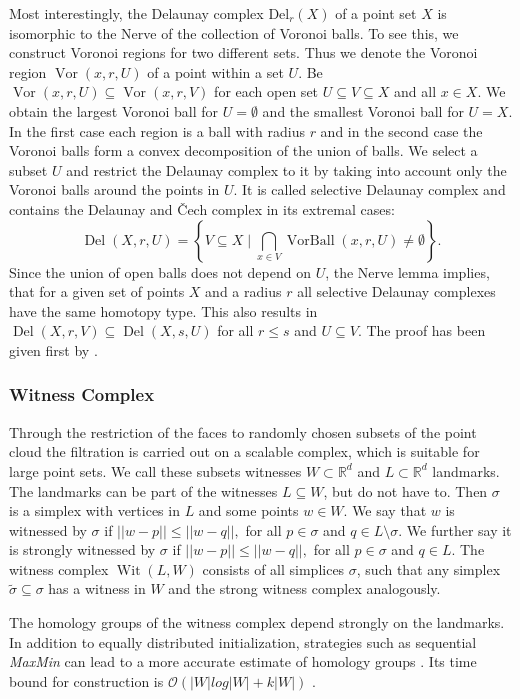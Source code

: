 \documentclass[runningheads]{llncs}
\DeclareMathOperator{\VorBall}{\text{VorBall}}
\DeclareMathOperator{\Vor}{\text{Vor}}
\DeclareMathOperator{\Del}{\text{Del}}
\DeclareMathOperator{\Wit}{\text{Wit}}
\begin{document}
Most interestingly, the Delaunay complex $\text{Del}_r(X)$ of a point set $X$ is isomorphic to the Nerve of the collection of Voronoi balls. To see this, we construct Voronoi regions for two different sets. Thus we denote the Voronoi region $\Vor(x,r,U)$ of a point within a set $U$. Be $\Vor(x,r,U) \subseteq \Vor(x,r,V)$ for each open set $U \subseteq V \subseteq X$ and all $x \in X$. We obtain the largest Voronoi ball for $U = \emptyset$ and the smallest Voronoi ball for $U = X$. In the first case each region is a ball with radius $r$ and in the second case the Voronoi balls form a convex decomposition of the union of balls. We select a subset $U$ and restrict the Delaunay complex to it by taking into account only the Voronoi balls around the points in $U$. It is called selective Delaunay complex and contains the Delaunay and \v{Cech} complex in its extremal cases:
\begin{equation}
\Del(X,r,U) = \left\{V \subseteq X \; \bigg\vert \; \bigcap_{x \in V} \VorBall(x,r,U) \neq \emptyset \right\}.
\end{equation}
Since the union of open balls does not depend on $U$, the Nerve lemma implies, that for a given set of points $X$ and a radius $r$ all selective Delaunay complexes have the same homotopy type. This also results in $\Del(X,r,V) \subseteq \Del(X,s,U)$ for all $r \leq s$ and $U \subseteq V$. The proof has been given first by \cite[§3.4]{bauer2017morse}.

\subsubsection{Witness Complex} Through the restriction of the faces to randomly chosen subsets of the point cloud the filtration is carried out on a scalable complex, which is suitable for large point sets. We call these subsets witnesses $W \subset \mathbb{R}^d$ and $L \subset \mathbb{R}^d$ landmarks. The landmarks can be part of the witnesses $L \subseteq W$, but do not have to. Then $\sigma$ is a simplex with vertices in $L$ and some points $w \in W$. We say that $w$ is witnessed by $\sigma$ if $||w-p|| \leq ||w-q||,$ for all $p \in \sigma$ and $q \in L \setminus \sigma.$ We further say it is strongly witnessed by $\sigma$ if $||w-p|| \leq ||w-q||,$ for all $p \in \sigma$ and $q \in L$. The witness complex $\Wit(L,W)$ consists of all simplices $\sigma$, such that any simplex $\tilde{\sigma} \subseteq \sigma$ has a witness in $W$ and the strong witness complex analogously.

The homology groups of the witness complex depend strongly on the landmarks. In addition to equally distributed initialization, strategies such as sequential \textit{MaxMin} can lead to a more accurate estimate of homology groups \cite{de2004topological}. Its time bound for construction is $\mathcal{O}\left(|W|log|W|+k|W|\right)$ \cite{boissonnat2018geometric}.
\end{document}
